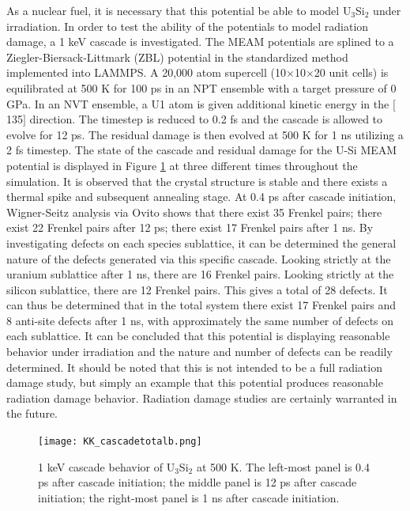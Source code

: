\documentclass[review]{elsarticle}
\begin{document}
As a nuclear fuel, it is necessary that this potential be able to model U$_{3}$Si$_{2}$ under irradiation.  In order to test the ability of the potentials to model radiation damage, a 1 keV cascade is investigated.   The MEAM potentials are splined to a Ziegler-Biersack-Littmark (ZBL) \cite{zbl} potential in the standardized method implemented into LAMMPS.  A 20,000 atom supercell (10$\times$10$\times$20 unit cells) is equilibrated at 500 K for 100 ps in an NPT ensemble with a target pressure of 0 GPa.  In an NVT ensemble, a U1 atom is given additional kinetic energy in the $[$135$]$ direction.  The timestep is reduced to 0.2 fs and the cascade is allowed to evolve for 12 ps.  The residual damage is then evolved at 500 K for 1 ns utilizing a 2 fs timestep.  The state of the cascade and residual damage for the U-Si MEAM potential is displayed in Figure \ref{fig:ben6} at three different times throughout the simulation.  It is observed that the crystal structure is stable and there exists a thermal spike and subsequent annealing stage.  At 0.4 ps after cascade initiation, Wigner-Seitz analysis via Ovito \cite{ovito} shows that there exist 35 Frenkel pairs; there exist 22 Frenkel pairs after 12 ps; there exist 17 Frenkel pairs after 1 ns.  By investigating defects on each species sublattice, it can be determined the general nature of the defects generated via this specific cascade.  Looking strictly at the uranium sublattice after 1 ns, there are 16 Frenkel pairs.  Looking strictly at the silicon sublattice, there are 12 Frenkel pairs.  This gives a total of 28 defects.  It can thus be determined that in the total system there exist 17 Frenkel pairs and 8 anti-site defects after 1 ns, with approximately the same number of defects on each sublattice.  It can be concluded that this potential is displaying reasonable behavior under irradiation and the nature and number of defects can be readily determined.  It should be noted that this is not intended to be a full radiation damage study, but simply an example that this potential produces reasonable radiation damage behavior.  Radiation damage studies are certainly warranted in the future.  

\begin{figure}[bt]
	\centering
	\texttt{[image: KK\_cascadetotalb.png]}
    \caption{1 keV cascade behavior of U$_{3}$Si$_{2}$ at 500 K.  The left-most panel is 0.4 ps after cascade initiation; the middle panel is 12 ps after cascade initiation; the right-most panel is 1 ns after cascade initiation.}\label{fig:ben6}
\end{figure}
\end{document}
